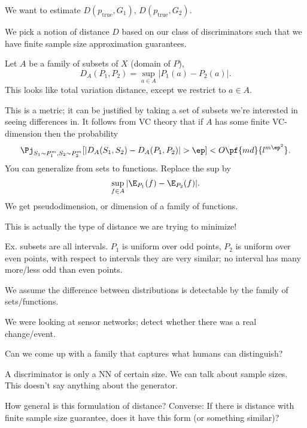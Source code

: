 We want to estimate $D(p_{\text{true}}, G_1)$, $D(p_{\text{true}}, G_2)$. %

We pick a notion of distance $D$ based on our class of discriminators such that we have finite sample size approximation guarantees.

Let $A$ be a family of subsets of $X$ (domain of $P$), 
$$
D_A(P_1,P_2) = \sup_{a\in A}|P_1(a)-P_2(a)|.
$$
This looks like total variation distance, except we restrict to $a\in A$.

This is a metric; it can be justified by taking a set of subsets we're interested in seeing differences in. It follows from VC theory that if $A$ has some finite VC-dimension then the probability
$$
\Pj_{S_1\sim P_1^m,S_2\sim P_2^m}
[|D_A(S_1,S_2) - D_A(P_1,P_2)|>\ep]
<O\pf{md}{l^{m\ep^2}}.
$$
You can generalize from sets to functions. Replace the sup by 
$$
\sup_{f\in A} |\E_{P_1}(f) - \E_{P_2}(f)|.
$$
We get pseudodimension, or dimension of a family of functions.

This is actually the type of distance we are trying to minimize!

Ex. subsets are all intervals. $P_1$ is uniform over odd points, $P_2$ is uniform over even points, with respect to intervals they are very similar; no interval has many more/less odd than even points.

We assume the difference between distributions is detectable by the family of sets/functions.

We were looking at sensor networks; detect whether there was a real change/event.

Can we come up with a family that captures what humans can distinguish?


A discriminator is only a NN of certain size. We can talk about sample sizes. This doesn't say anything about the generator.

How general is this formulation of distance? Converse: If there is distance with finite sample size guarantee, does it have this form (or something similar)?


